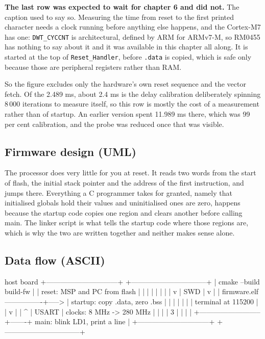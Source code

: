 \textbf{The last row was expected to wait for chapter 6 and did not.} The caption
used to say so. Measuring the time from reset to the first printed character needs a
clock running before anything else happens, and the Cortex-M7 has one:
\texttt{DWT\_CYCCNT} is architectural, defined by ARM for ARMv7-M, so RM0455 has
nothing to say about it and it was available in this chapter all along. It is
started at the top of \texttt{Reset\_Handler}, before \texttt{.data} is copied,
which is safe only because those are peripheral registers rather than RAM.

So the figure excludes only the hardware's own reset sequence and the vector fetch.
Of the 2.489 ms, about 2.4 ms is the delay calibration deliberately spinning 8\,000
iterations to measure itself, so this row is mostly the cost of a measurement rather
than of startup. An earlier version spent 11.989 ms there, which was 99 per cent
calibration, and the probe was reduced once that was visible.

\subsection*{Firmware design (UML)}


The processor does very little for you at reset. It reads two words from the
start of flash, the initial stack pointer and the address of the first
instruction, and jumps there. Everything a C programmer takes for granted,
namely that initialised globals hold their values and uninitialised ones are
zero, happens because the startup code copies one region and clears another
before calling main. The linker script is what tells the startup code where
those regions are, which is why the two are written together and neither makes
sense alone.

\subsection*{Data flow (ASCII)}

\begin{asciiart}
  host                                   board
  +------------------------------+       +--------------------------------+
  | cmake --build build-fw          |       | reset: MSP and PC from flash   |
  |   |                          |       |   |                            |
  |   v                          |  SWD  |   v                            |
  | firmware.elf ----------------+-----> | startup: copy .data, zero .bss |
  |                              |       |   |                            |
  | terminal at 115200           |       |   v                            |
  |   ^                          | USART | clocks: 8 MHz -> 280 MHz       |
  |   |                          |  3    |   |                            |
  |   +--------------------------+-------+ main: blink LD1, print a line  |
  +------------------------------+       +--------------------------------+
\end{asciiart}

